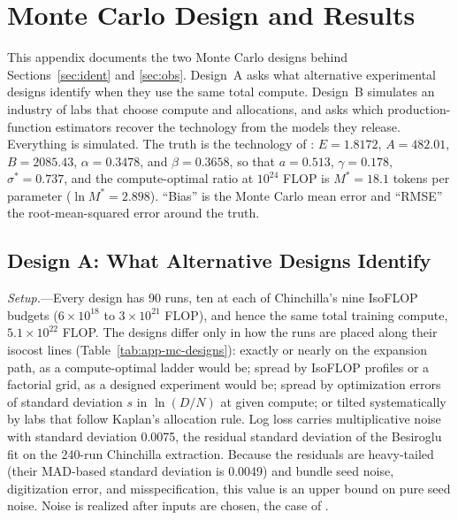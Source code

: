 
\section{Monte Carlo Design and Results}\label{app:mc}
\setlength{\emergencystretch}{2em}%

This appendix documents the two Monte Carlo designs behind Sections~\ref{sec:ident} and \ref{sec:obs}.
Design~A asks what alternative experimental designs identify when they use the same total compute. Design~B
simulates an industry of labs that choose compute and allocations, and asks which production-function estimators
recover the technology from the models they release. Everything is simulated. The truth is the technology of
\citet{besiroglu2024chinchilla}: $E=1.8172$, $A=482.01$, $B=2085.43$, $\alpha=0.3478$, and $\beta=0.3658$, so that
$a=0.513$, $\gamma=0.178$, $\sigma^*=0.737$, and the compute-optimal ratio at $10^{24}$ FLOP is $M^*=18.1$ tokens
per parameter ($\ln M^*=2.898$). ``Bias'' is the Monte Carlo mean error and ``RMSE'' the root-mean-squared error
around the truth.

\subsection{Design A: What Alternative Designs Identify}\label{app:mc-designA}

\emph{Setup.}---Every design has 90 runs, ten at each of Chinchilla's nine IsoFLOP budgets ($6\times10^{18}$ to
$3\times10^{21}$ FLOP), and hence the same total training compute, $5.1\times10^{22}$ FLOP. The designs differ only
in how the runs are placed along their isocost lines (Table~\ref{tab:app-mc-designs}): exactly or nearly on the
expansion path, as a compute-optimal ladder would be; spread by IsoFLOP profiles or a factorial grid, as a designed
experiment would be; spread by optimization errors of standard deviation $s$ in $\ln(D/N)$ at given compute; or
tilted systematically by labs that follow Kaplan's allocation rule. Log loss carries multiplicative noise with
standard deviation 0.0075, the residual standard deviation of the Besiroglu fit on the 240-run Chinchilla
extraction. Because the residuals are heavy-tailed (their MAD-based standard deviation is 0.0049) and bundle
seed noise, digitization error, and misspecification, this value is an upper bound on pure seed noise. Noise is
realized after inputs are chosen, the case of \citet{zellner1966specification}.

